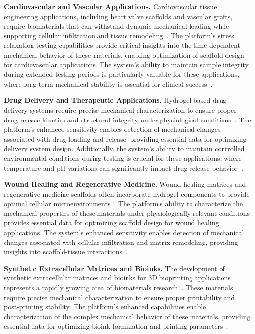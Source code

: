 \textbf{Cardiovascular and Vascular Applications.} Cardiovascular tissue engineering applications, including heart valve scaffolds and vascular grafts, require biomaterials that can withstand dynamic mechanical loading while supporting cellular infiltration and tissue remodeling~\cite{seitz2013stressrelaxationresponse, ma2025structurallysophisticated}. The platform's stress relaxation testing capabilities provide critical insights into the time-dependent mechanical behavior of these materials, enabling optimization of scaffold design for cardiovascular applications. The system's ability to maintain sample integrity during extended testing periods is particularly valuable for these applications, where long-term mechanical stability is essential for clinical success~\cite{korhonen2002comparisonequilibrium}.

\textbf{Drug Delivery and Therapeutic Applications.} Hydrogel-based drug delivery systems require precise mechanical characterization to ensure proper drug release kinetics and structural integrity under physiological conditions~\cite{chaudhuri2016hydrogelstunable, shamloo2018acceleratedfullthickness}. The platform's enhanced sensitivity enables detection of mechanical changes associated with drug loading and release, providing essential data for optimizing delivery system design. Additionally, the system's ability to maintain controlled environmental conditions during testing is crucial for these applications, where temperature and pH variations can significantly impact drug release behavior~\cite{patel2019systematicreview}.

\textbf{Wound Healing and Regenerative Medicine.} Wound healing matrices and regenerative medicine scaffolds often incorporate hydrogel components to provide optimal cellular microenvironments~\cite{antoine2014review, shamloo2018acceleratedfullthickness}. The platform's ability to characterize the mechanical properties of these materials under physiologically relevant conditions provides essential data for optimizing scaffold design for wound healing applications. The system's enhanced sensitivity enables detection of mechanical changes associated with cellular infiltration and matrix remodeling, providing insights into scaffold-tissue interactions~\cite{nichol2010cellviability}.

\textbf{Synthetic Extracellular Matrices and Bioinks.} The development of synthetic extracellular matrices and bioinks for 3D bioprinting applications represents a rapidly growing area of biomaterials research~\cite{bercea2024recent, bahcecioglu20193dprinted, elkommos2025hybridhydrogels}. These materials require precise mechanical characterization to ensure proper printability and post-printing stability. The platform's enhanced capabilities enable characterization of the complex mechanical behavior of these materials, providing essential data for optimizing bioink formulation and printing parameters~\cite{rowley1999alginatehydrogels, shim2012bioprintingmechanically}.

